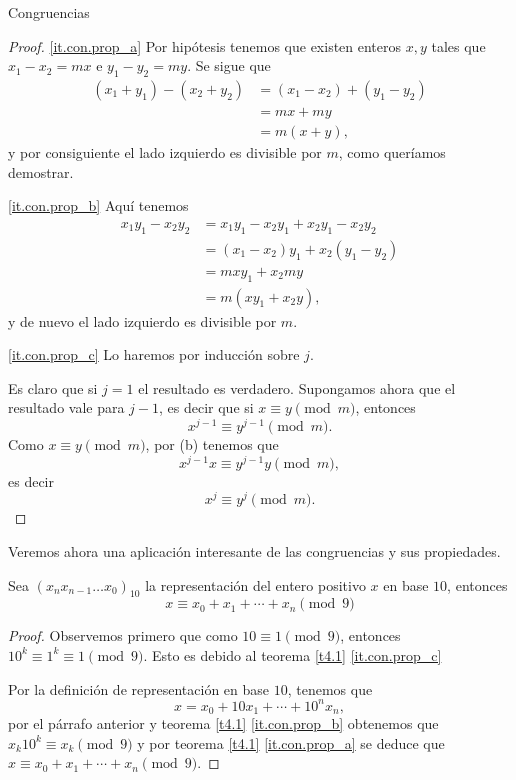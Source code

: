 \begin{section}{Congruencias}
\begin{proof}
\ref{it.con.prop_a} Por hipótesis tenemos que existen enteros
$x,y$ tales que $x_1-x_2=mx$ e $y_1-y_2=my$. Se sigue que
$$
\begin{aligned}
(x_1+y_1)-(x_2+y_2) &= (x_1-x_2)+ (y_1 -y_2) \\
&= mx +my \\
&= m(x+y),
\end{aligned}
$$
y por consiguiente el lado izquierdo es divisible por $m$, como
queríamos demostrar.

\ref{it.con.prop_b} Aquí tenemos
$$
\begin{aligned}
x_1y_1-x_2y_2 &=  x_1y_1-x_2y_1+ x_2y_1-x_2y_2 \\
&= (x_1-x_2)y_1+ x_2(y_1 -y_2) \\
&= mxy_1 +x_2my \\
&= m(xy_1+x_2y),
\end{aligned}
$$
y de nuevo el lado izquierdo es divisible por $m$.

\ref{it.con.prop_c}  Lo haremos por inducción sobre $j$. 

Es claro que si $j=1$ el resultado es verdadero. Supongamos ahora que el resultado vale para $j-1$, es decir que si  $x \equiv y \pmod{m}$, entonces 
$$
x^{j-1} \equiv y^{j-1} \pmod{m}.
$$
Como $x \equiv y \pmod{m}$,  por   { (b)} tenemos que 
$$
x^{j-1}x \equiv y^{j-1}y  \pmod{m},
$$
es decir 
$$
x^j \equiv y^j \pmod{m}.
$$
\end{proof}


Veremos ahora una aplicación interesante de las congruencias y  sus propiedades. 

\begin{proposicion}\label{prop412}
Sea $(x_nx_{n-1}\ldots x_0)_{10}$ la representación del entero positivo $x$ en base $10$, entonces
$$
x \equiv x_0+x_1+\cdots+x_n \pmod{9}
$$
\end{proposicion}
\begin{proof}
 Observemos primero que como $10\equiv 1\pmod{9}$, entonces  $10^k\equiv 1^k \equiv 1\pmod{9}$. Esto es debido  al teorema \ref{t4.1} \ref{it.con.prop_c} 

Por la definición de representación en base $10$, tenemos que 
$$x=x_0 + 10x_1+ \cdots+10^nx_n,$$ 
por el párrafo anterior y teorema \ref{t4.1} \ref{it.con.prop_b}   obtenemos que $x_k10^k \equiv x_k \pmod{9}$ y por
teorema \ref{t4.1} \ref{it.con.prop_a}  se deduce que $x \equiv
x_0+x_1+\cdots+x_n \pmod{9}$.
\end{proof}


\end{section}
